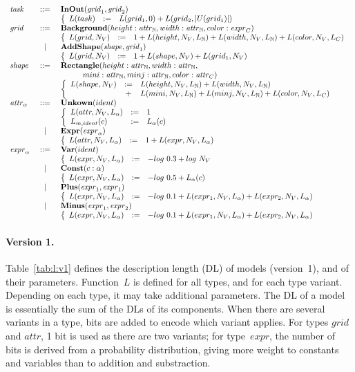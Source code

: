 \documentclass[a4paper]{llncs}
\newenvironment{datatype}{$\begin{array}{lcl}}{\end{array}$}
\newcommand{\is}{&\ ::=\ &}
\newcommand{\altis}{\\ &\ \mid\ &}
\newcommand{\baction}{\\ & & \left\{\begin{array}{lcl}}
\newcommand{\eaction}{\end{array}\right.}
\newcommand{\defby}{& := &}
\newcommand{\nat}{\mathbb{N}}
\begin{document}

\begin{table}[t]
\caption{Definition of the description length of models and their parameters}
\begin{center}
\begin{datatype}
  {\it task} \is {\bf InOut}({\it grid}_1, {\it grid}_2)
  \baction
  L(task) \defby L(grid_1,0) + L(grid_2,|U(grid_1)|)
  \eaction
  \\
  {\it grid} \is {\bf Background}(height: {\it attr}_\nat, width: {\it attr}_\nat, color: {\it expr}_C)
  \baction
  L(grid,N_V) \defby 1 + L(height,N_V,L_\nat) + L(width,N_V,L_\nat) + L(color,N_V,L_C)
  \eaction
  \altis {\bf AddShape}({\it shape}, {\it grid}_1)
  \baction
  L(grid,N_V) \defby 1 + L(shape,N_V) + L(grid_1,N_V)
  \eaction
  \\
  {\it shape} \is {\bf Rectangle}(height: {\it attr}_\nat, width: {\it attr}_\nat,\\
  & & \hspace*{1cm} mini: {\it attr}_\nat, minj: {\it attr}_\nat, color: {\it attr}_C)
  \baction
  L(shape,N_V) \defby L(height,N_V,L_\nat) + L(width,N_V,L_\nat) \\
  & + & L(mini,N_V,L_\nat) + L(minj,N_V,L_\nat) + L(color,N_V,L_C)
  \eaction
  \\
  {\it attr}_\alpha \is {\bf Unkown}(ident)
  \baction
  L(attr,N_V,L_\alpha) \defby 1 \\
  L_{m,ident}(c) \defby L_\alpha(c)
  \eaction
  \altis {\bf Expr}({\it expr}_\alpha)
  \baction
  L(attr,N_V,L_\alpha) \defby 1 + L(expr,N_V,L_\alpha)
  \eaction
  \\
  {\it expr}_\alpha \is {\bf Var}(ident)
  \baction
  L(expr,N_V,L_\alpha) \defby -log\ 0.3 + log\ N_V
  \eaction
  \altis {\bf Const}(c: \alpha)
  \baction
  L(expr,N_V,L_\alpha) \defby -log\ 0.5 + L_\alpha(c)
  \eaction
  \altis {\bf Plus}({\it expr}_1, {\it expr}_1)
  \baction
  L(expr,N_V,L_\alpha) \defby -log\ 0.1 + L(expr_1,N_V,L_\alpha) + L(expr_2,N_V,L_\alpha)
  \eaction
  \altis {\bf Minus}({\it expr}_1, {\it expr}_2)
  \baction
  L(expr,N_V,L_\alpha) \defby -log\ 0.1 + L(expr_1,N_V,L_\alpha) + L(expr_2,N_V,L_\alpha)
  \eaction
\end{datatype}
\end{center}
\label{tab:l:v1}
\end{table}

\paragraph{Version 1.} Table~\ref{tab:l:v1} defines the description
length (DL) of models (version~1), and of their
parameters. Function~$L$ is defined for all types, and for each type
variant. Depending on each type, it may take additional
parameters. The DL of a model is essentially the sum of the DLs of its
components. When there are several variants in a type, bits are added
to encode which variant applies. For types $grid$ and $attr$, 1 bit is
used as there are two variants; for type~$expr$, the number of bits is
derived from a probability distribution, giving more weight to
constants and variables than to addition and substraction.
\end{document}
